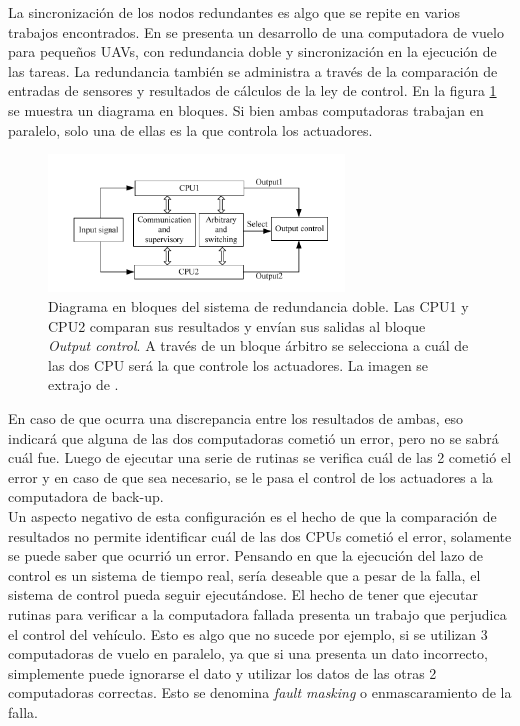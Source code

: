 La sincronización de los nodos redundantes es algo que se repite en varios trabajos encontrados. En \cite{zhang2015dual} se presenta un desarrollo de una computadora de vuelo para pequeños UAVs, con redundancia doble y sincronización en la ejecución de las tareas. La redundancia también se administra a través de la comparación de entradas de sensores y resultados de cálculos de la ley de control. En la figura  \ref{fig:FCC_dual_FPGA} se muestra un diagrama en bloques. Si bien ambas computadoras trabajan en paralelo, solo una de ellas es la que controla los actuadores. 

\begin{figure}[H]
    \centering
    \includegraphics[width=0.7\textwidth]{img/FCC_dual_FPGA.png}
    \caption{Diagrama en bloques del sistema de redundancia doble. Las CPU1 y CPU2 comparan sus resultados y envían sus salidas al bloque \textit{Output control}. A través de un bloque árbitro se selecciona a cuál de las dos CPU será la que controle los actuadores. La imagen se extrajo de \cite{zhang2015dual}.}
    \label{fig:FCC_dual_FPGA}
\end{figure}

En caso de que ocurra una discrepancia entre los resultados de ambas, eso indicará que alguna de las dos computadoras cometió un error, pero no se sabrá cuál fue. Luego de ejecutar una serie de rutinas se verifica cuál de las 2 cometió el error y en caso de que sea necesario, se le pasa el control de los actuadores a la computadora de back-up.\\

Un aspecto negativo de esta configuración es el hecho de que la comparación de resultados no permite identificar cuál de las dos CPUs cometió el error, solamente se puede saber que ocurrió un error. Pensando en que la ejecución del lazo de control es un sistema de tiempo real, sería deseable que a pesar de la falla, el sistema de control pueda seguir ejecutándose. El hecho de tener que ejecutar rutinas para verificar a la computadora fallada presenta un trabajo que perjudica el control del vehículo. Esto es algo que no sucede por ejemplo, si se utilizan 3 computadoras de vuelo en paralelo, ya que si una presenta un dato incorrecto, simplemente puede ignorarse el dato y utilizar los datos de las otras 2 computadoras correctas. Esto se denomina \textit{fault masking} o enmascaramiento de la falla.\\

